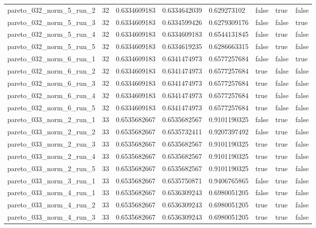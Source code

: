 \begin{tabular}{@{}llllllll@{}}
pareto\_032\_norm\_5\_run\_2 & 32 & 0.6334609183 & 0.6334642039 & 0.629273102 & false & true & false \\
pareto\_032\_norm\_5\_run\_3 & 32 & 0.6334609183 & 0.6334599426 & 0.6279309176 & false & false & true \\
pareto\_032\_norm\_5\_run\_4 & 32 & 0.6334609183 & 0.6334609183 & 0.6544131845 & false & true & false \\
pareto\_032\_norm\_5\_run\_5 & 32 & 0.6334609183 & 0.6334619235 & 0.6286663315 & false & true & false \\
pareto\_032\_norm\_6\_run\_1 & 32 & 0.6334609183 & 0.6341474973 & 0.6577257684 & false & false & true \\
pareto\_032\_norm\_6\_run\_2 & 32 & 0.6334609183 & 0.6341474973 & 0.6577257684 & true & false & false \\
pareto\_032\_norm\_6\_run\_3 & 32 & 0.6334609183 & 0.6341474973 & 0.6577257684 & true & false & false \\
pareto\_032\_norm\_6\_run\_4 & 32 & 0.6334609183 & 0.6341474973 & 0.6577257684 & true & false & false \\
pareto\_032\_norm\_6\_run\_5 & 32 & 0.6334609183 & 0.6341474973 & 0.6577257684 & true & false & false \\
pareto\_033\_norm\_2\_run\_1 & 33 & 0.6535682667 & 0.6535682567 & 0.9101190325 & false & true & false \\
pareto\_033\_norm\_2\_run\_2 & 33 & 0.6535682667 & 0.6535732411 & 0.9207397492 & false & true & false \\
pareto\_033\_norm\_2\_run\_3 & 33 & 0.6535682667 & 0.6535682567 & 0.9101190325 & true & true & false \\
pareto\_033\_norm\_2\_run\_4 & 33 & 0.6535682667 & 0.6535682567 & 0.9101190325 & true & true & false \\
pareto\_033\_norm\_2\_run\_5 & 33 & 0.6535682667 & 0.6535682567 & 0.9101190325 & true & true & false \\
pareto\_033\_norm\_3\_run\_1 & 33 & 0.6535682667 & 0.6535750871 & 0.9406765865 & false & true & false \\
pareto\_033\_norm\_4\_run\_1 & 33 & 0.6535682667 & 0.6536309243 & 0.6980051205 & false & true & false \\
pareto\_033\_norm\_4\_run\_2 & 33 & 0.6535682667 & 0.6536309243 & 0.6980051205 & true & true & false \\
pareto\_033\_norm\_4\_run\_3 & 33 & 0.6535682667 & 0.6536309243 & 0.6980051205 & true & true & false \\

\end{tabular}
